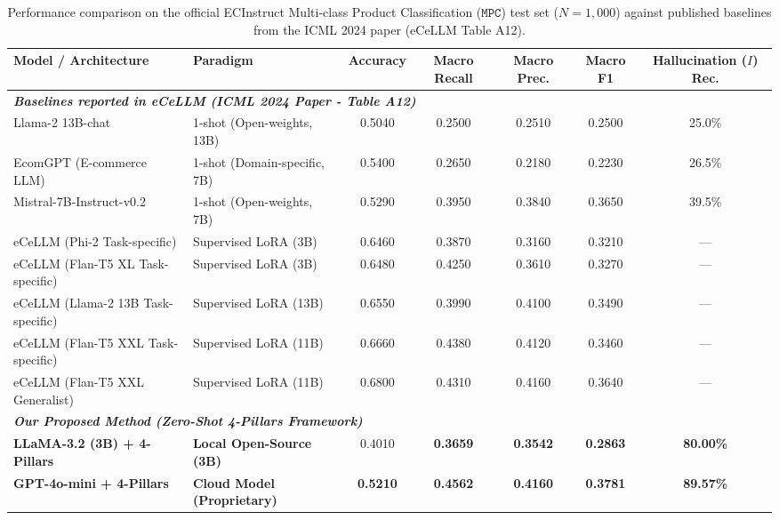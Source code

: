 
\begin{table}[t]
\centering
\caption{Performance comparison on the official ECInstruct Multi-class Product Classification ($\mathtt{MPC}$) test set ($N=1,000$) against published baselines from the ICML 2024 paper (eCeLLM Table A12).}
\label{tab:ecinstruct_mpc_comparison}
\small
\begin{tabular}{llccccc}
\toprule
\textbf{Model / Architecture} & \textbf{Paradigm} & \textbf{Accuracy} & \textbf{Macro Recall} & \textbf{Macro Prec.} & \textbf{Macro F1} & \textbf{Hallucination ($I$) Rec.} \\
\midrule
\multicolumn{7}{l}{\textit{\textbf{Baselines reported in eCeLLM (ICML 2024 Paper - Table A12)}}} \\
Llama-2 13B-chat & 1-shot (Open-weights, 13B) & 0.5040 & 0.2500 & 0.2510 & 0.2500 & 25.0\% \\
EcomGPT (E-commerce LLM) & 1-shot (Domain-specific, 7B) & 0.5400 & 0.2650 & 0.2180 & 0.2230 & 26.5\% \\
Mistral-7B-Instruct-v0.2 & 1-shot (Open-weights, 7B) & 0.5290 & 0.3950 & 0.3840 & 0.3650 & 39.5\% \\
eCeLLM (Phi-2 Task-specific) & Supervised LoRA (3B) & 0.6460 & 0.3870 & 0.3160 & 0.3210 & --- \\
eCeLLM (Flan-T5 XL Task-specific) & Supervised LoRA (3B) & 0.6480 & 0.4250 & 0.3610 & 0.3270 & --- \\
eCeLLM (Llama-2 13B Task-specific)& Supervised LoRA (13B)& 0.6550 & 0.3990 & 0.4100 & 0.3490 & --- \\
eCeLLM (Flan-T5 XXL Task-specific)& Supervised LoRA (11B)& 0.6660 & 0.4380 & 0.4120 & 0.3460 & --- \\
eCeLLM (Flan-T5 XXL Generalist) & Supervised LoRA (11B)& 0.6800 & 0.4310 & 0.4160 & 0.3640 & --- \\
\midrule
\multicolumn{7}{l}{\textit{\textbf{Our Proposed Method (Zero-Shot 4-Pillars Framework)}}} \\
\textbf{LLaMA-3.2 (3B) + 4-Pillars} & \textbf{Local Open-Source (3B)} & 0.4010 & \textbf{0.3659} & \textbf{0.3542} & \textbf{0.2863} & \textbf{80.00\%} \\
\textbf{GPT-4o-mini + 4-Pillars} & \textbf{Cloud Model (Proprietary)} & \textbf{0.5210} & \textbf{0.4562} & \textbf{0.4160} & \textbf{0.3781} & \textbf{89.57\%} \\
\bottomrule
\end{tabular}
\end{table}
